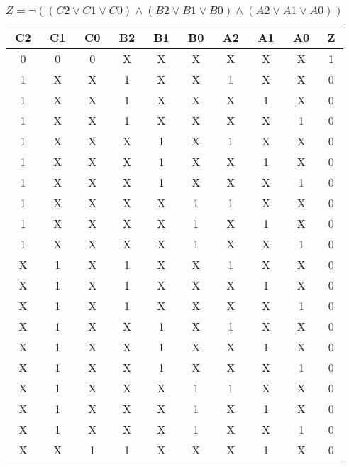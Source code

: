 \begin{center}
    \begin{table}[h] \caption{\(Z = \lnot ((C2 \lor C1 \lor C0) \land (B2 \lor B1 \lor B0) \land (A2 \lor A1 \lor A0)) \)}
        \begin{center}
            \begin{tabular}{|c|c|c|c|c|c|c|c|c||c|} \hline
            C2 & C1 & C0 & B2 & B1 & B0 & A2 & A1 & A0 & Z \\ \hline\hline
            0  & 0  & 0  & X  & X  & X  & X  & X  & X  & 1 \\ \hline
            1  & X  & X  & 1  & X  & X  & 1  & X  & X  & 0 \\ \hline
            1  & X  & X  & 1  & X  & X  & X  & 1  & X  & 0 \\ \hline
            1  & X  & X  & 1  & X  & X  & X  & X  & 1  & 0 \\ \hline
            1  & X  & X  & X  & 1  & X  & 1  & X  & X  & 0 \\ \hline
            1  & X  & X  & X  & 1  & X  & X  & 1  & X  & 0 \\ \hline
            1  & X  & X  & X  & 1  & X  & X  & X  & 1  & 0 \\ \hline
            1  & X  & X  & X  & X  & 1  & 1  & X  & X  & 0 \\ \hline
            1  & X  & X  & X  & X  & 1  & X  & 1  & X  & 0 \\ \hline
            1  & X  & X  & X  & X  & 1  & X  & X  & 1  & 0 \\ \hline
            X  & 1  & X  & 1  & X  & X  & 1  & X  & X  & 0 \\ \hline
            X  & 1  & X  & 1  & X  & X  & X  & 1  & X  & 0 \\ \hline
            X  & 1  & X  & 1  & X  & X  & X  & X  & 1  & 0 \\ \hline
            X  & 1  & X  & X  & 1  & X  & 1  & X  & X  & 0 \\ \hline
            X  & 1  & X  & X  & 1  & X  & X  & 1  & X  & 0 \\ \hline
            X  & 1  & X  & X  & 1  & X  & X  & X  & 1  & 0 \\ \hline
            X  & 1  & X  & X  & X  & 1  & 1  & X  & X  & 0 \\ \hline
            X  & 1  & X  & X  & X  & 1  & X  & 1  & X  & 0 \\ \hline
            X  & 1  & X  & X  & X  & 1  & X  & X  & 1  & 0 \\ \hline
            X  & X  & 1  & 1  & X  & X  & X  & 1  & X  & 0 \\ \hline

\end{tabular}
\end{center}
\end{table}
\end{center}

